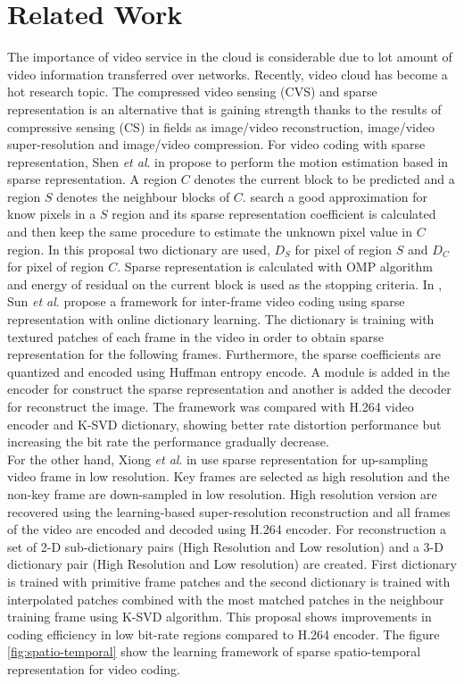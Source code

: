 \chapter{Related Work}

The importance of video service in the cloud is considerable due to lot amount of video information transferred over networks. Recently, video cloud has become a hot research topic. The compressed video sensing (CVS) and sparse representation is an alternative that is gaining strength thanks to the results of compressive sensing (CS) in fields as image/video reconstruction, image/video super-resolution and image/video compression. For video coding with sparse representation, Shen \emph{et al}. in \cite{motion_cs} propose to perform the motion estimation based in sparse representation. A region $C$ denotes the current block to  be predicted and a region $S$ denotes the neighbour blocks of $C$.  search a good approximation for know pixels in a $S$ region and its sparse representation coefficient is calculated and then keep the same procedure to estimate the unknown pixel value in $C$ region. In this proposal two dictionary are used, $D_S$ for pixel of region $S$ and $D_C$ for pixel of region $C$. Sparse representation is calculated with OMP algorithm and energy of residual on the current block is used as the stopping criteria. In \cite{odl_me}, Sun \emph{et al}. propose a framework for inter-frame video coding using sparse representation with online dictionary learning. The dictionary is training with textured patches of each frame in the video in order to obtain sparse representation for the following frames. Furthermore, the sparse coefficients are quantized and encoded using Huffman entropy encode. A module is added in the encoder for construct the sparse representation and another is added the decoder for reconstruct the image. The framework was compared with H.264 video encoder and  K-SVD dictionary, showing better rate distortion performance but increasing the bit rate the performance gradually decrease. \\

For the other hand, Xiong \emph{et al}. in \cite{sparse_st, 6189245} use sparse representation for up-sampling video frame in low resolution. Key frames are selected as high resolution and the non-key frame are down-sampled in low resolution. High resolution version are recovered  using the learning-based super-resolution reconstruction and all frames of the video are encoded and decoded using H.264 encoder. For reconstruction a set of 2-D sub-dictionary pairs (High Resolution and Low resolution) and a 3-D dictionary pair (High Resolution and Low resolution) are created. First dictionary is trained with primitive frame patches and the second dictionary is trained with interpolated patches combined with the most matched patches in the neighbour training frame using K-SVD algorithm. This proposal shows improvements in coding efficiency in low bit-rate regions compared to H.264 encoder. The figure \ref{fig:spatio-temporal} show the learning framework of sparse spatio-temporal representation for video coding. \\

